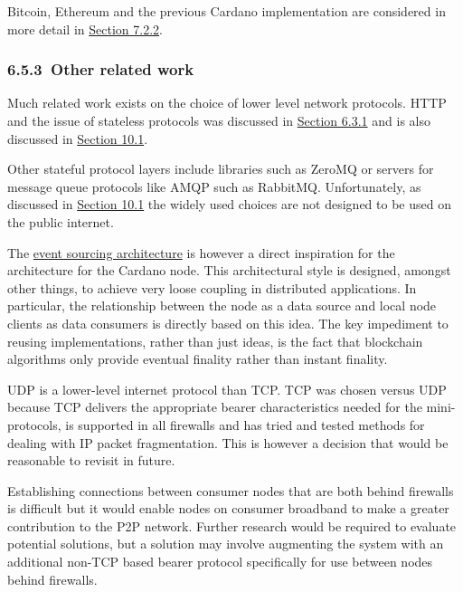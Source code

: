 \documentclass[11pt,a4paper]{article}
\begin{document}
Bitcoin, Ethereum and the previous Cardano implementation are considered
in more detail in
\protect\hyperlink{comparison-with-previous-network-implementations}{{Section
7.2.2}}.

\hypertarget{other-related-work}{%
\subsubsection{​6.5.3​~Other related work}\label{other-related-work}}

Much related work exists on the choice of lower level network protocols.
HTTP and the issue of stateless protocols was discussed in
\protect\hyperlink{stateful-versus-stateless-protocols}{{Section 6.3.1}}
and is also discussed in
\protect\hyperlink{stateful-implementation}{{Section 10.1}}.

Other stateful protocol layers include libraries such as ZeroMQ or
servers for message queue protocols like AMQP such as RabbitMQ.
Unfortunately, as discussed in
\protect\hyperlink{stateful-implementation}{{Section 10.1}} the widely
used choices are not designed to be used on the public internet.

The \href{https://martinfowler.com/eaaDev/EventSourcing.html}{{event
sourcing architecture}} is however a direct inspiration for the
architecture for the Cardano node. This architectural style is designed,
amongst other things, to achieve very loose coupling in distributed
applications. In particular, the relationship between the node as a data
source and local node clients as data consumers is directly based on
this idea. The key impediment to reusing implementations, rather than
just ideas, is the fact that blockchain algorithms only provide eventual
finality rather than instant finality.

UDP is a lower-level internet protocol than TCP. TCP was chosen versus
UDP because TCP delivers the appropriate bearer characteristics needed
for the mini-protocols, is supported in all firewalls and has tried and
tested methods for dealing with IP packet fragmentation. This is however
a decision that would be reasonable to revisit in future.

Establishing connections between consumer nodes that are both behind
firewalls is difficult but it would enable nodes on consumer broadband
to make a greater contribution to the P2P network. Further research
would be required to evaluate potential solutions, but a solution may
involve augmenting the system with an additional non-TCP based bearer
protocol specifically for use between nodes behind firewalls.
\end{document}
